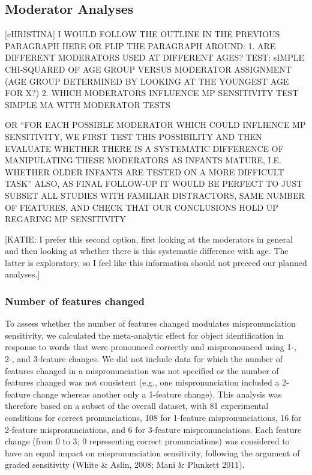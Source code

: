 \documentclass[man]{apa6}
\theoremstyle{definition}
\theoremstyle{definition}
\theoremstyle{definition}
\theoremstyle{remark}
\begin{document}
\subsection{Moderator Analyses}\label{moderator-analyses}

{[}cHRISTINA{]} I WOULD FOLLOW THE OUTLINE IN THE PREVIOUS PARAGRAPH
HERE OR FLIP THE PARAGRAPH AROUND: 1. ARE DIFFERENT MODERATORS USED AT
DIFFERENT AGES? TEST: sIMPLE CHI-SQUARED OF AGE GROUP VERSUS MODERATOR
ASSIGNMENT (AGE GROUP DETERMINED BY LOOKING AT THE YOUNGEST AGE FOR X?)
2. WHICH MODERATORS INFLUENCE MP SENSITIVITY TEST SIMPLE MA WITH
MODERATOR TESTS

OR \enquote{FOR EACH POSSIBLE MODERATOR WHICH COULD INFLIENCE MP
SENSITIVITY, WE FIRST TEST THIS POSSIBILITY AND THEN EVALUATE WHETHER
THERE IS A SYSTEMATIC DIFFERENCE OF MANIPULATING THESE MODERATORS AS
INFANTS MATURE, I.E. WHETHER OLDER INFANTS ARE TESTED ON A MORE
DIFFICULT TASK} ALSO, AS FINAL FOLLOW-UP IT WOULD BE PERFECT TO JUST
SUBSET ALL STUDIES WITH FAMILIAR DISTRACTORS, SAME NUMBER OF FEATURES,
AND CHECK THAT OUR CONCLUSIONS HOLD UP REGARING MP SENSITIVITY

{[}KATIE: I prefer this second option, first looking at the moderators
in general and then looking at whether there is this systematic
difference with age. The latter is exploratory, so I feel like this
information should not preceed our planned analyses.{]}

\subsubsection{Number of features
changed}\label{number-of-features-changed}

To assess whether the number of features changed modulates
mispronunciation sensitivity, we calculated the meta-analytic effect for
object identification in response to words that were pronounced
correctly and mispronounced using 1-, 2-, and 3-feature changes. We did
not include data for which the number of features changed in a
mispronunciation was not specified or the number of features changed was
not consistent (e.g., one mispronunciation included a 2-feature change
whereas another only a 1-feature change). This analysis was therefore
based on a subset of the overall dataset, with 81 experimental
conditions for correct pronunciations, 108 for 1-feature
mispronunciations, 16 for 2-feature mispronunciations, and 6 for
3-feature mispronunciations. Each feature change (from 0 to 3; 0
representing correct pronunciations) was considered to have an equal
impact on mispronunciation sensitivity, following the argument of graded
sensitivity (White \& Aslin, 2008; Mani \& Plunkett 2011).
\end{document}
